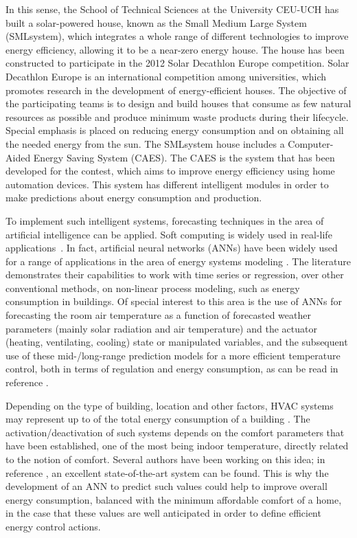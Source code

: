 \documentclass[energies,article,accept,moreauthors,pdftex,12pt,a4paper]{mdpi}
\newcommand{\ann}{ANN\xspace}
\newcommand{\anns}{ANNs\xspace}
\newcommand{\caes}{CAES\xspace}
\newcommand{\smlsystem}{SMLsystem\xspace}
\begin{document}
In this sense, the School of Technical Sciences at the University CEU-UCH has built a solar-powered house, known as the Small Medium Large System (\smlsystem), which
integrates a whole range of different technologies to improve energy efficiency, allowing it to be a near-zero energy house. \linebreak The house has been constructed to participate in the 2012 Solar
Decathlon Europe competition. \linebreak Solar Decathlon Europe \cite{solar} is an
international competition among universities, which promotes research in the
development of  energy-efficient houses. The objective of the participating teams is to
design and build houses that consume as few natural resources as possible and
produce minimum waste products during their lifecycle. Special emphasis is
placed on reducing energy consumption and on obtaining all the needed energy
from the sun. The \smlsystem house includes a Computer-Aided Energy Saving
System (\caes). The \caes is the system that has been developed for the contest,
which aims to improve energy efficiency using home automation devices. This system
has different intelligent modules in order to make predictions about energy
consumption and production.

To implement such intelligent systems, forecasting techniques in the area of
artificial intelligence can be applied. Soft computing is widely used in
real-life applications~\cite{2009:Wu,2012:Taormina}. In fact, artificial neural networks
(\anns) have been widely used for a range of applications in the area of energy
systems \linebreak modeling \cite{Karatasou, 2006:energyandbuildings:ruano, Ferreira,
 2012:kdir:zamora}. The literature demonstrates their capabilities to work with
time series or regression, over other conventional methods, on non-linear
process modeling, such as energy consumption in buildings. Of special interest to
this area is the use of \anns for forecasting the room air temperature as a
function of forecasted weather parameters (mainly solar radiation and air
temperature) and the actuator (heating, ventilating, cooling) state or manipulated
variables, and the subsequent use of these mid-/long-range prediction models for
a more efficient temperature control, both in terms of regulation and energy
consumption, as can be read in reference \cite{2006:energyandbuildings:ruano}.

Depending on the type of building, location and other factors, HVAC systems
may represent up to  of the total energy
consumption of a building \cite{Ferreira,Alvarez}. 
The activation/deactivation of such systems depends
on the comfort parameters that have been established, one of the most being indoor temperature, directly related to the notion of
comfort. Several authors have been working on this idea; \linebreak in reference \cite{Ferreira},
an excellent state-of-the-art system can be found. This is why the development of an \ann
to predict such values could help to improve overall energy consumption,
balanced with the minimum affordable comfort of a home, in the case that these values are
well anticipated in order to define efficient energy control actions.
\end{document}
